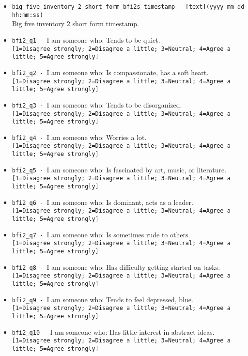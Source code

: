 \begin{description}
\begin{addmargin}[0em]{0em}
\begin{addmargin}[1em]{0em}
\begin{itemize}
            \item \verb|big_five_inventory_2_short_form_bfi2s_timestamp - [text](yyyy-mm-dd hh:mm:ss)|\\Big five inventory 2 short form timestamp.
            \item \verb|bfi2_q1 - |I am someone who: Tends to be quiet.\\\verb|[1=Disagree strongly; 2=Disagree a little; 3=Neutral; 4=Agree a little; 5=Agree strongly]|
            \item \verb|bfi2_q2 - |I am someone who: Is compassionate, has a soft heart.\\\verb|[1=Disagree strongly; 2=Disagree a little; 3=Neutral; 4=Agree a little; 5=Agree strongly]|
            \item \verb|bfi2_q3 - |I am someone who: Tends to be disorganized.\\\verb|[1=Disagree strongly; 2=Disagree a little; 3=Neutral; 4=Agree a little; 5=Agree strongly]|
            \item \verb|bfi2_q4 - |I am someone who: Worries a lot.\\\verb|[1=Disagree strongly; 2=Disagree a little; 3=Neutral; 4=Agree a little; 5=Agree strongly]|
            \item \verb|bfi2_q5 - |I am someone who: Is fascinated by art, music, or literature.\\\verb|[1=Disagree strongly; 2=Disagree a little; 3=Neutral; 4=Agree a little; 5=Agree strongly]|
            \item \verb|bfi2_q6 - |I am someone who: Is dominant, acts as a leader.\\\verb|[1=Disagree strongly; 2=Disagree a little; 3=Neutral; 4=Agree a little; 5=Agree strongly]|
            \item \verb|bfi2_q7 - |I am someone who: Is sometimes rude to others.\\\verb|[1=Disagree strongly; 2=Disagree a little; 3=Neutral; 4=Agree a little; 5=Agree strongly]|
            \item \verb|bfi2_q8 - |I am someone who: Has difficulty getting started on tasks.\\\verb|[1=Disagree strongly; 2=Disagree a little; 3=Neutral; 4=Agree a little; 5=Agree strongly]|
            \item \verb|bfi2_q9 - |I am someone who: Tends to feel depressed, blue.\\\verb|[1=Disagree strongly; 2=Disagree a little; 3=Neutral; 4=Agree a little; 5=Agree strongly]|
            \item \verb|bfi2_q10 - |I am someone who: Has little interest in abstract ideas.\\\verb|[1=Disagree strongly; 2=Disagree a little; 3=Neutral; 4=Agree a little; 5=Agree strongly]|

\end{itemize}
\end{addmargin}
\end{addmargin}
\end{description}
